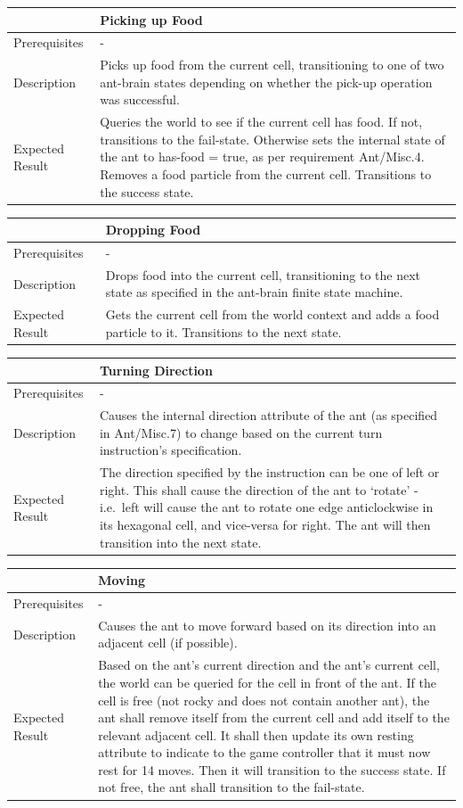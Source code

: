 \documentclass[11pt]{article}
\begin{document}
\begin{longtable}[c]{@{}p{}p{}@{}}
\toprule
& Picking up Food \tabularnewline
\midrule
Prerequisites & - \tabularnewline
Description & Picks up food from the current cell, transitioning to
one of two ant-brain states depending on whether the pick-up operation
was successful. \tabularnewline
Expected Result & Queries the world to see if the current cell has food.
If not, transitions to the fail-state. Otherwise sets the internal state
of the ant to has-food = true, as per requirement Ant/Misc.4. Removes a
food particle from the current cell. Transitions to the success state. \tabularnewline
\bottomrule
\end{longtable}

\begin{longtable}[c]{@{}p{}p{}@{}}
\toprule
& Dropping Food \tabularnewline
\midrule
Prerequisites & - \tabularnewline
Description & Drops food into the current cell, transitioning to the
next state as specified in the ant-brain finite state machine. \tabularnewline
Expected Result & Gets the current cell from the world context and adds a
food particle to it. Transitions to the next state. \tabularnewline
\bottomrule
\end{longtable}

\begin{longtable}[c]{@{}p{}p{}@{}}
\toprule
& Turning Direction \tabularnewline
\midrule
Prerequisites & - \tabularnewline
Description & Causes the internal direction attribute of the ant (as
specified in Ant/Misc.7) to change based on the current turn
instruction's specification. \tabularnewline
Expected Result & The direction specified by the instruction can be one
of left or right. This shall cause the direction of the ant to `rotate'
- i.e.~left will cause the ant to rotate one edge anticlockwise in its
hexagonal cell, and vice-versa for right. The ant will then transition
into the next state. \tabularnewline
\bottomrule
\end{longtable}

\begin{longtable}[c]{@{}p{}p{}@{}}
\toprule
& Moving \tabularnewline
\midrule
Prerequisites & - \tabularnewline
Description & Causes the ant to move forward based on its direction
into an adjacent cell (if possible). \tabularnewline
Expected Result & Based on the ant's current direction and the ant's
current cell, the world can be queried for the cell in front of the ant.
If the cell is free (not rocky and does not contain another ant), the
ant shall remove itself from the current cell and add itself to the
relevant adjacent cell. It shall then update its own resting attribute
to indicate to the game controller that it must now rest for 14 moves.
Then it will transition to the success state. If not free, the ant shall
transition to the fail-state. \tabularnewline
\bottomrule
\end{longtable}
\end{document}
